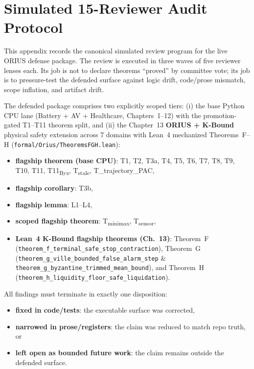 \chapter{Simulated 15-Reviewer Audit Protocol}
\label{app:four-reviewer-audit}

This appendix records the canonical simulated review program for the live
ORIUS defense package.  The review is executed in three waves of five
reviewer lenses each.  Its job is not to declare theorems ``proved'' by
committee vote; its job is to pressure-test the defended surface against
logic drift, code/prose mismatch, scope inflation, and artifact drift.

The defended package comprises two explicitly scoped tiers: (i) the base Python CPU lane
(Battery + AV + Healthcare, Chapters~1--12) with the promotion-gated T1--T11 theorem split, and
(ii) the Chapter~13 \textbf{ORIUS + K-Bound} physical safety extension across 7 domains with
Lean~4 mechanized Theorems~F--H (\texttt{formal/Orius/TheoremsFGH.lean}):
\begin{itemize}
\item \textbf{flagship theorem (base CPU)}: T1, T2, T3a, T4, T5, T6, T7, T8, T9, T10, T11, T11\textsubscript{Byz}, T\textsubscript{stale}, T\_trajectory\_PAC,
\item \textbf{flagship corollary}: T3b,
\item \textbf{flagship lemma}: L1--L4,
\item \textbf{scoped flagship theorem}: T\textsubscript{minimax}, T\textsubscript{sensor},
\item \textbf{Lean~4 K-Bound flagship theorems (Ch.~13)}: Theorem~F (\texttt{theorem\_\allowbreak f\_\allowbreak terminal\_\allowbreak safe\_\allowbreak stop\_\allowbreak contraction}), Theorem~G (\texttt{theorem\_\allowbreak g\_\allowbreak ville\_\allowbreak bounded\_\allowbreak false\_\allowbreak alarm\_\allowbreak step} \& \texttt{theorem\_\allowbreak g\_\allowbreak byzantine\_\allowbreak trimmed\_\allowbreak mean\_\allowbreak bound}), and Theorem~H (\texttt{theorem\_\allowbreak h\_\allowbreak liquidity\_\allowbreak floor\_\allowbreak safe\_\allowbreak liquidation}).
\end{itemize}

All findings must terminate in exactly one disposition:
\begin{itemize}
\item \textbf{fixed in code/tests}: the executable surface was corrected,
\item \textbf{narrowed in prose/registers}: the claim was reduced to match repo truth, or
\item \textbf{left open as bounded future work}: the claim remains outside the defended surface.
\end{itemize}

